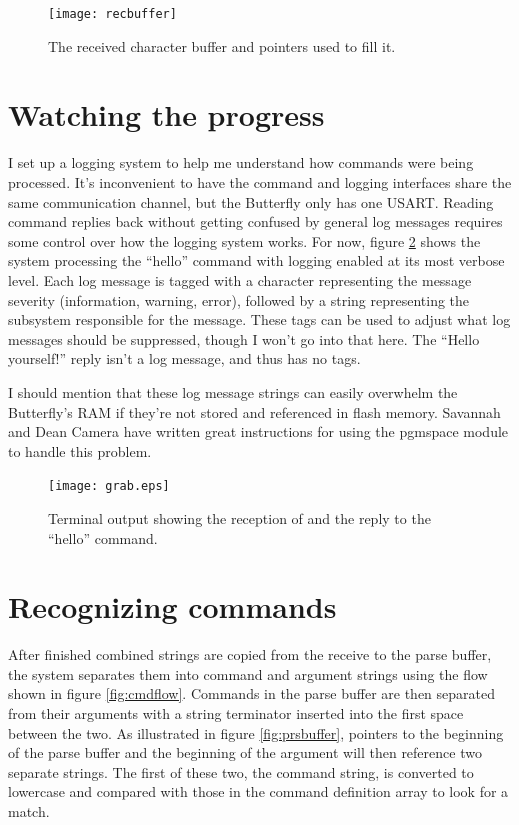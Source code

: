 \begin{figure}[ht]
    \begin{center}
        \texttt{[image: recbuffer]}
        \caption{The received character buffer and pointers used to fill it.\label{fig:recbuffer}}
    \end{center}
\end{figure}

\clearpage{}
\section{Watching the progress}
I set up a logging system to help me understand how commands were being processed.  It's inconvenient to have the command and logging interfaces share the same communication channel, but the Butterfly only has one USART.  Reading command replies back without getting confused by general log messages requires some control over how the logging system works.  For now, figure \ref{fig:termgrab} shows the system processing the ``hello'' command with logging enabled at its most verbose level.  Each log message is tagged with a character representing the message severity (information, warning, error), followed by a string representing the subsystem responsible for the message.  These tags can be used to adjust what log messages should be suppressed, though I won't go into that here.  The ``Hello yourself!'' reply isn't a log message, and thus has no tags.

I should mention that these log message strings can easily overwhelm the Butterfly's RAM if they're not stored and referenced in flash memory.  Savannah\cite{url:savannah:pgmspace} and Dean Camera\cite{url:deancamera:pgmspace} have written great instructions for using the pgmspace module to handle this problem.

\begin{figure}[ht]
    \begin{center}
        \texttt{[image: grab.eps]}
        \caption{Terminal output showing the reception of and the reply to the ``hello'' command.\label{fig:termgrab}}
    \end{center}
\end{figure}




\clearpage{}
\section{Recognizing commands}
After finished combined strings are copied from the receive to the parse buffer, the system separates them into command and argument strings using the flow shown in figure \ref{fig:cmdflow}.  Commands in the parse buffer are then separated from their arguments with a string terminator inserted into the first space between the two.  As illustrated in figure \ref{fig:prsbuffer}, pointers to the beginning of the parse buffer and the beginning of the argument will then reference two separate strings.  The first of these two, the command string, is converted to lowercase and compared with those in the command definition array to look for a match.

